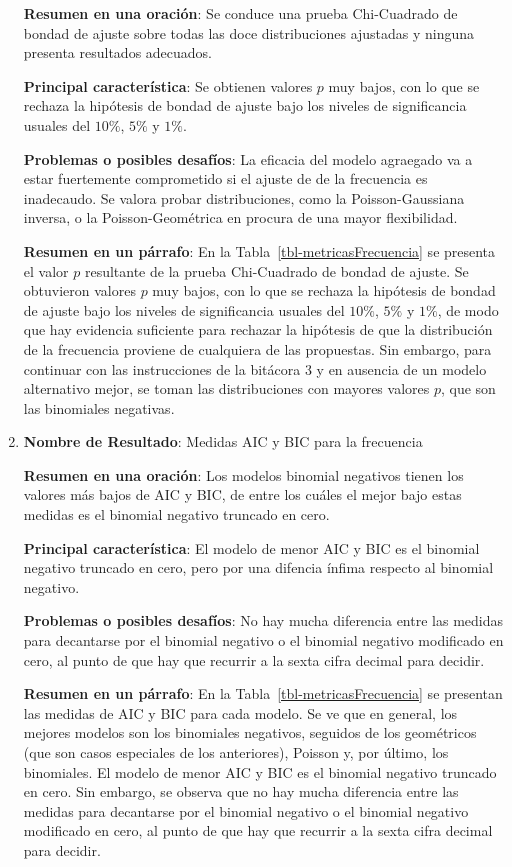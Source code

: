 \documentclass[
  letterpaper,
  onepage,
  openany]{scrreprt}
\begin{document}
\begin{enumerate}
  \textbf{Resumen en una oración}: Se conduce una prueba Chi-Cuadrado de
  bondad de ajuste sobre todas las doce distribuciones ajustadas y
  ninguna presenta resultados adecuados.

  \textbf{Principal característica}: Se obtienen valores \(p\) muy
  bajos, con lo que se rechaza la hipótesis de bondad de ajuste bajo los
  niveles de significancia usuales del \(10\%\), \(5\%\) y \(1\%\).

  \textbf{Problemas o posibles desafíos}: La eficacia del modelo
  agraegado va a estar fuertemente comprometido si el ajuste de de la
  frecuencia es inadecaudo. Se valora probar distribuciones, como la
  Poisson-Gaussiana inversa, o la Poisson-Geométrica en procura de una
  mayor flexibilidad.

  \textbf{Resumen en un párrafo}: En la
  Tabla~\ref{tbl-metricasFrecuencia} se presenta el valor \(p\)
  resultante de la prueba Chi-Cuadrado de bondad de ajuste. Se
  obtuvieron valores \(p\) muy bajos, con lo que se rechaza la hipótesis
  de bondad de ajuste bajo los niveles de significancia usuales del
  \(10\%\), \(5\%\) y \(1\%\), de modo que hay evidencia suficiente para
  rechazar la hipótesis de que la distribución de la frecuencia proviene
  de cualquiera de las propuestas. Sin embargo, para continuar con las
  instrucciones de la bitácora 3 y en ausencia de un modelo alternativo
  mejor, se toman las distribuciones con mayores valores \(p\), que son
  las binomiales negativas.
\item
  \textbf{Nombre de Resultado}: Medidas AIC y BIC para la frecuencia

  \textbf{Resumen en una oración}: Los modelos binomial negativos tienen
  los valores más bajos de AIC y BIC, de entre los cuáles el mejor bajo
  estas medidas es el binomial negativo truncado en cero.

  \textbf{Principal característica}: El modelo de menor AIC y BIC es el
  binomial negativo truncado en cero, pero por una difencia ínfima
  respecto al binomial negativo.

  \textbf{Problemas o posibles desafíos}: No hay mucha diferencia entre
  las medidas para decantarse por el binomial negativo o el binomial
  negativo modificado en cero, al punto de que hay que recurrir a la
  sexta cifra decimal para decidir.

  \textbf{Resumen en un párrafo}: En la
  Tabla~\ref{tbl-metricasFrecuencia} se presentan las medidas de AIC y
  BIC para cada modelo. Se ve que en general, los mejores modelos son
  los binomiales negativos, seguidos de los geométricos (que son casos
  especiales de los anteriores), Poisson y, por último, los binomiales.
  El modelo de menor AIC y BIC es el binomial negativo truncado en cero.
  Sin embargo, se observa que no hay mucha diferencia entre las medidas
  para decantarse por el binomial negativo o el binomial negativo
  modificado en cero, al punto de que hay que recurrir a la sexta cifra
  decimal para decidir.
\end{enumerate}
\end{document}
